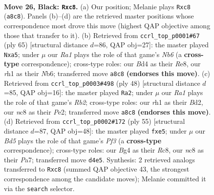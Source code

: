 \documentclass[11pt]{article}
\begin{document}
\begin{figure}[p]\centering
\begin{subfigure}{0.46\textwidth}\centering
\resizebox{\linewidth}{!}{%
\newchessgame
\chessboard[
  setfen={r1N5/1ppn1pkP/p7/P3P1p1/1PNbP1b1/8/8/R3KB1R b KQ - 0 26},
  showmover=false,
  pgfstyle=straightmove, color=movearrow, markmove={a8-c8}
]}
\caption{}
\end{subfigure}\hfill
\begin{subfigure}{0.46\textwidth}\centering
\resizebox{\linewidth}{!}{%
\newchessgame
\chessboard[
  setfen={4r1k1/7p/1n1pN1p1/R2P1b2/2p2P2/1nN1p1PP/6B1/4R1K1 b - - 0 33},
  showmover=false,
  pgfstyle=straightmove, color=movearrow, markmove={b3-a5}
]}
\caption{}
\end{subfigure}
\\[4pt]
\begin{subfigure}{0.46\textwidth}\centering
\resizebox{\linewidth}{!}{%
\newchessgame
\chessboard[
  setfen={2bk3r/1p2p3/2np1npp/1N1B2p1/2P5/5PP1/1R1BP2P/6K1 w - - 3 25},
  showmover=false,
  pgfstyle=straightmove, color=movearrow, markmove={b2-a2}
]}
\caption{}
\end{subfigure}\hfill
\begin{subfigure}{0.46\textwidth}\centering
\resizebox{\linewidth}{!}{%
\newchessgame
\chessboard[
  setfen={2r3k1/p2b4/3Pppp1/p3P2p/2n1PB1P/Pr1N4/6P1/R2R2K1 b - - 3 28},
  showmover=false,
  pgfstyle=straightmove, color=movearrow, markmove={f6-e5}
]}
\caption{}
\end{subfigure}
\caption{\textbf{Move 26, Black: \texttt{Rxc8}.} (a) Our position; Melanie plays \texttt{Rxc8} (\texttt{a8c8}). Panels (b)--(d) are the retrieved master positions whose correspondence most drove this move (highest QAP objective among those that transfer to it). (b) Retrieved from \texttt{ccrl\_top\_p0001\#67} (ply 65) [structural distance $d$=86, QAP obj=27]: the master played \texttt{Nxa5}; under $\mu$ our \emph{Ra1} plays the role of that game's \emph{Nb6} (a \textbf{cross-type} correspondence); cross-type roles: our \emph{B}d4 as their \emph{R}e8, our \emph{r}h1 as their \emph{N}b6; transferred move \texttt{a8c8} \textbf{(endorses this move)}. (c) Retrieved from \texttt{ccrl\_top\_p0003\#498} (ply 48) [structural distance $d$=85, QAP obj=16]: the master played \texttt{Ra2}; under $\mu$ our \emph{Ra1} plays the role of that game's \emph{Rb2}; cross-type roles: our \emph{r}h1 as their \emph{B}d2, our \emph{n}c8 as their \emph{P}e2; transferred move \texttt{a8c8} \textbf{(endorses this move)}. (d) Retrieved from \texttt{ccrl\_top\_p0002\#172} (ply 55) [structural distance $d$=87, QAP obj=48]: the master played \texttt{fxe5}; under $\mu$ our \emph{Bd5} plays the role of that game's \emph{Pf3} (a \textbf{cross-type} correspondence); cross-type roles: our \emph{B}g4 as their \emph{R}c8, our \emph{n}c8 as their \emph{P}a7; transferred move \texttt{d4e5}. Synthesis: 2 retrieved analogs transferred to \texttt{Rxc8} (summed QAP objective 43, the strongest correspondence among the candidate moves); Melanie committed it via the \texttt{search} selector.}
\label{fig:thought-m51}
\end{figure}
\end{document}
